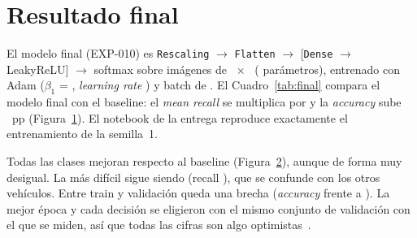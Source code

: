 \section{Resultado final}
\label{sec:final}
El modelo final (EXP-010) es \texttt{Rescaling} $\rightarrow$ \texttt{Flatten} $\rightarrow$ 
[\texttt{Dense} $\rightarrow$ LeakyReLU] $\rightarrow$ softmax sobre imágenes de ~$\times$~
( parámetros), entrenado con Adam ($\beta_1$ = , \emph{learning rate}
) y batch de . El Cuadro~\ref{tab:final} compara el modelo final con el baseline: el
\emph{mean recall} se multiplica por  y la \emph{accuracy} sube ~pp
(Figura~\ref{fig:progress}). El notebook de la entrega reproduce exactamente el entrenamiento de la semilla~1.

\begin{table}[h]
  \centering\small
  \caption{Baseline frente al modelo final (validación; media $\pm$ desviación típica de  semillas).}
  \label{tab:final}
\end{table}

\begin{figure}[!htbp]
  \centering
  \caption{}
  \label{fig:progress}
\end{figure}

Todas las clases mejoran respecto al baseline (Figura~\ref{fig:final}), aunque de forma muy desigual. La más difícil
sigue siendo  (recall ), que se confunde con los otros vehículos. Entre
train y validación queda una brecha (\emph{accuracy}  frente a ). La mejor
época y cada decisión se eligieron con el mismo conjunto de validación con el que se miden, así que todas las cifras son
algo optimistas~\cite{cawley}.

\begin{figure}[!htbp]
  \centering
  \caption{}
  \label{fig:final}
\end{figure}

